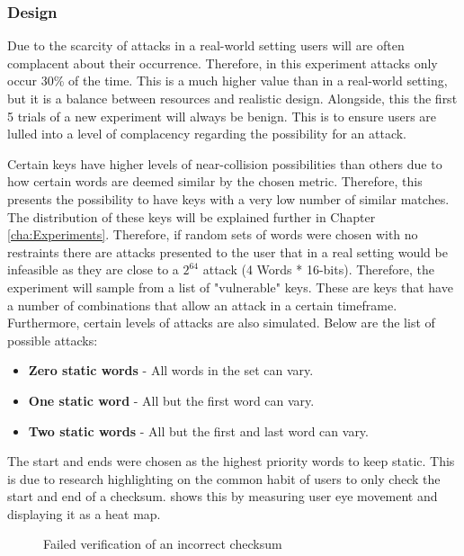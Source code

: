 \subsubsection{Design}

Due to the scarcity of attacks in a real-world setting users will are often complacent about their occurrence. Therefore, in this experiment attacks only occur 30\% of the time. This is a much higher value than in a real-world setting, but it is a balance between resources and realistic design. Alongside, this the first 5 trials of a new experiment will always be benign. This is to ensure users are lulled into a level of complacency regarding the possibility for an attack.

Certain keys have higher levels of near-collision possibilities than others due to how certain words are deemed similar by the chosen metric. Therefore, this presents the possibility to have keys with a very low number of similar matches. The distribution of these keys will be explained further in Chapter \ref{cha:Experiments}. Therefore, if random sets of words were chosen with no restraints there are attacks presented to the user that in a real setting would be infeasible as they are close to a $2^{64}$ attack (4 Words * 16-bits). Therefore, the experiment will sample from a list of "vulnerable" keys. These are keys that have a number of combinations that allow an attack in a certain timeframe. Furthermore, certain levels of attacks are also simulated. Below are the list of possible attacks:

\begin{itemize}
    \item \textbf{Zero static words} - All words in the set can vary.
    \item \textbf{One static word} - All but the first word can vary.
    \item \textbf{Two static words} - All but the first and last word can vary.
\end{itemize}

The start and ends were chosen as the highest priority words to keep static. This is due to research highlighting on the common habit of users to only check the start and end of a checksum. \cite{cherubini2018towards} shows this by measuring user eye movement and displaying it as a heat map.

\begin{figure}[h!]
    \centering
    \caption{Failed verification of an incorrect checksum\cite{cherubini2018towards}}
    \label{fig:heatMap}
\end{figure}

